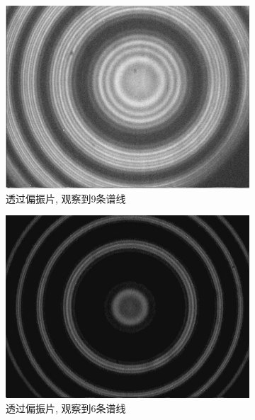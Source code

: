 \documentclass[12pt,a4paper]{article}
\begin{document}
\begin{figure}[H]
    \centering
    \begin{subfigure}[b]{0.3\textwidth}
      \centering
      \includegraphics[width=\textwidth]{2.74gp.jpg}
      \caption{透过偏振片, 观察到9条谱线}
    \end{subfigure}
    \hfill
    \begin{subfigure}[b]{0.3\textwidth}
      \centering
      \includegraphics[width=\textwidth]{MultiRings-polorizeB.jpg}
      \caption{透过偏振片, 观察到6条谱线}
    \end{subfigure}
    \hfill
    \begin{subfigure}[b]{0.3\textwidth}
      \centering

\end{subfigure}
\end{figure}
\end{document}
